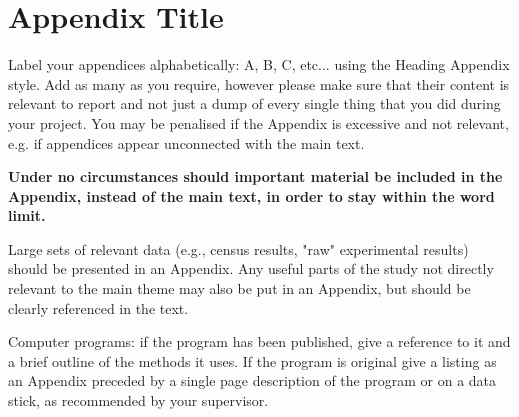\documentclass[a4paper,12pt]{article}
\begin{document}
\section{Appendix Title}
\label{sec:appendix}

Label your appendices alphabetically: A, B, C, etc... using the Heading Appendix style. Add as many as you require, however please make sure that their content is relevant to report and not just a dump of every single thing that you did during your project. You may be penalised if the Appendix is excessive and not relevant, e.g. if appendices appear unconnected with the main text.

\textbf{Under no circumstances should important material be included in the Appendix, instead of the
  main text, in order to stay within the word limit.}

Large sets of relevant data (e.g., census results, "raw" experimental results) should be presented in an Appendix. Any useful parts of the study not directly relevant to the main theme may also be put in an Appendix, but should be clearly referenced in the text. 

Computer programs: if the program has been published, give a reference to it and a brief outline of the methods it uses. If the program is original give a listing as an Appendix preceded by a single page description of the program or on a data stick, as recommended by your supervisor.
\end{document}
